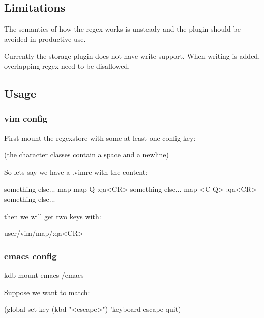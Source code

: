 \subsection*{Limitations}

The semantics of how the regex works is unsteady and the plugin should be avoided in productive use.

Currently the storage plugin does not have write support. When writing is added, overlapping regex need to be disallowed.

\subsection*{Usage}

\subsubsection*{vim config}

First mount the regexstore with some at least one config key\+: 


(the character classes contain a space and a newline)

So lets say we have a .vimrc with the content\+: \begin{DoxyVerb}something else...
map map Q :qa<CR>
something else...
map <C-Q> :qa<CR>
something else...
\end{DoxyVerb}


then we will get two keys with\+: \begin{DoxyVerb}user/vim/map/:qa<CR>
\end{DoxyVerb}


\subsubsection*{emacs config}

\begin{DoxyVerb}kdb mount emacs /emacs
\end{DoxyVerb}


Suppose we want to match\+: \begin{DoxyVerb}(global-set-key (kbd "<escape>")      'keyboard-escape-quit)\end{DoxyVerb}
 